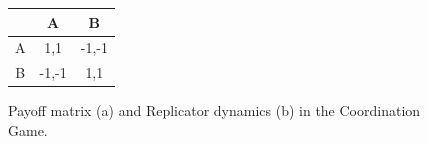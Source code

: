         \begin{figure}[H]
            \centering
            \begin{minipage}{0.45\textwidth}
                \centering
                \begin{tabular}{c|c|c}
                    & A & B \\ \hline
                    A & 1,1 & -1,-1 \\
                    B & -1,-1 & 1,1 \\
                \end{tabular}
                \vspace{2cm}
                \label{tab:coordination_game}
            \end{minipage}
            \hspace{0.3em}
            \begin{minipage}{0.45\textwidth}
                \centering
                \label{fig:coordination_game_dynamics}
            \end{minipage}
            \caption{Payoff matrix (a) and Replicator dynamics (b) in the Coordination Game.}
            \label{fig:coordination_game}
        \end{figure}

